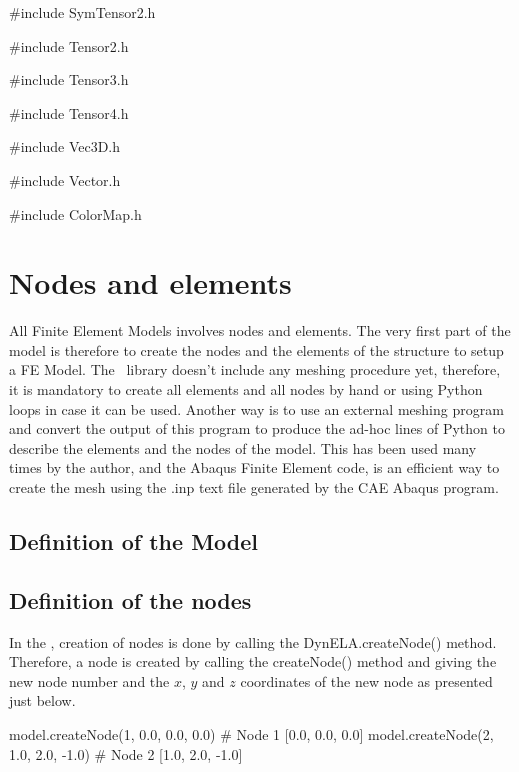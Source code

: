 \#include \textquotedbl SymTensor2.h\textquotedbl{}

\#include \textquotedbl Tensor2.h\textquotedbl{}

\#include \textquotedbl Tensor3.h\textquotedbl{}

\#include \textquotedbl Tensor4.h\textquotedbl{}

\#include \textquotedbl Vec3D.h\textquotedbl{}

\#include \textquotedbl Vector.h\textquotedbl{}

\#include \textquotedbl ColorMap.h\textquotedbl{}

\section{Nodes and elements}

All Finite Element Models involves nodes and elements. The very first
part of the model is therefore to create the nodes and the elements
of the structure to setup a FE Model. The \Dynela~library doesn't
include any meshing procedure yet, therefore, it is mandatory to create
all elements and all nodes by hand or using Python loops in case it
can be used. Another way is to use an external meshing program and
convert the output of this program to produce the ad-hoc lines of
Python to describe the elements and the nodes of the model. This has
been used many times by the author, and the Abaqus Finite Element
code, is an efficient way to create the mesh using the .inp text file
generated by the CAE Abaqus program.

\subsection{Definition of the Model}

\subsection{Definition of the nodes}

In the \Dynela, creation of nodes is done by calling the \textsf{DynELA.createNode()}
method. Therefore, a node is created by calling the \textsf{createNode()}
method and giving the new node number and the $x$, $y$ and $z$
coordinates of the new node as presented just below.

\begin{PythonListing}
model.createNode(1, 0.0, 0.0, 0.0)  # Node 1 [0.0, 0.0, 0.0]
model.createNode(2, 1.0, 2.0, -1.0) # Node 2 [1.0, 2.0, -1.0]
\end{PythonListing}

